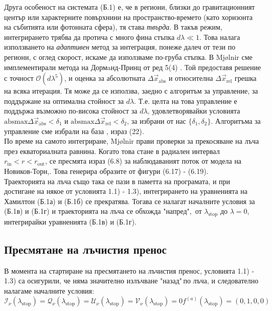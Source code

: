 \begin{appendices}
Друга особеност на системата (Б.1) е, че в региони, близки до гравитационният център или характерните повърхнини на пространство-времето (като хоризонта на събитията или фотонната сфера), тя става \emph{твърда}. В такъв режим, интегрирането трябва да протича с много фина стъпка $d\lambda \ll 1$. Това налага използването на \emph{адаптивен} метод за интеграция, понеже далеч от тези по региони, с оглед скорост, искаме да използваме по-груба стъпка. В Mjølnir сме имплементирали метода на Дормaнд-Принц от ред 5(4) \cite{RK45}. Той предоставя решение с точност $\mathcal{O}(d\lambda^5)$, и оценка за абсолютната $\Delta \vec{x}_\text{abs}$ и относителна $\Delta \vec{x}_\text{rel}$ грешка на всяка итерация. Тя може да се използва, заедно с алгоритъм за управление, за поддържане на оптимална стойност за $d\lambda$. Т.е. целта на това управление е поддържа възможно по-висока стойност за $d\lambda$, удовлетворявайки условията $\text{absmax} \Delta \vec{x}_\text{abs} < \delta_1$ и $\text{absmax} \Delta \vec{x}_\text{rel} < \delta_2$, за избрани от нас $\{\delta_1,\delta_2\}$. Алгоритъма за управление сме избрали на база \cite{Fekete_2022}, израз (22).\\

По време на самото интегриране, Mjølnir прави проверки за прекосяване на лъча през екваториалната равнина. Когато това стане в радиален интервал $r_\text{in} < r < r_\text{out}$, се пресмята израз (6.8) за наблюдаваният поток от модела на Новиков-Торн,. Това генерира образите от фигури (6.17) - (6.19).\\

Траекторията на лъча също така се пази в паметта на програмата, и при достигане на някое от условията 1.1) - 1.3), интегрирането на уравненията на Хамилтон (Б.1а) и (Б.1б) се прекратява. Тогава се налагат началните условия за (Б.1в) и (Б.1г) и траекторията на лъча се обхожда "напред"$,$ от $\lambda_{\text{stop}}$ до $\lambda = 0$, интегрирайки уравненията (Б.1в) и (Б.1г).

\subsection{Пресмятане на лъчистия пренос}

В момента на стартиране на пресмятането на лъчистия пренос, условията 1.1) - 1.3) са осигурили, че няма значително излъчване "назад"$\,$по лъча, и следователно налагаме началните условия:
\begin{subequations}
	\begin{equation}
		\mathcal{I}_\nu(\lambda_{\text{stop}}) = \mathcal{Q}_\nu(\lambda_{\text{stop}}) = \mathcal{U}_\nu(\lambda_{\text{stop}}) = \mathcal{V}_\nu(\lambda_{\text{stop}}) = 0
	\end{equation}
	\begin{equation}
		f^{(a)}(\lambda_{\text{stop}}) = (0,1,0,0)
	\end{equation}
\end{subequations}


\end{appendices}
